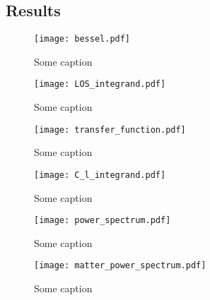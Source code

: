\subsection{Results}\label{sec:m4:results}

    \begin{figure}
        \texttt{[image: bessel.pdf]}
        \caption{Some caption}
        \label{fig:m3:some}
    \end{figure}

    \begin{figure}
        \texttt{[image: LOS\_integrand.pdf]}
        \caption{Some caption}
        \label{fig:m3:some}
    \end{figure}

    \begin{figure}
        \texttt{[image: transfer\_function.pdf]}
        \caption{Some caption}
        \label{fig:m3:some}
    \end{figure}

    \begin{figure}
        \texttt{[image: C\_l\_integrand.pdf]}
        \caption{Some caption}
        \label{fig:m3:some}
    \end{figure}

    \begin{figure}
        \texttt{[image: power\_spectrum.pdf]}
        \caption{Some caption}
        \label{fig:m3:some}
    \end{figure}

    \begin{figure}
        \texttt{[image: matter\_power\_spectrum.pdf]}
        \caption{Some caption}
        \label{fig:m3:some}
    \end{figure}